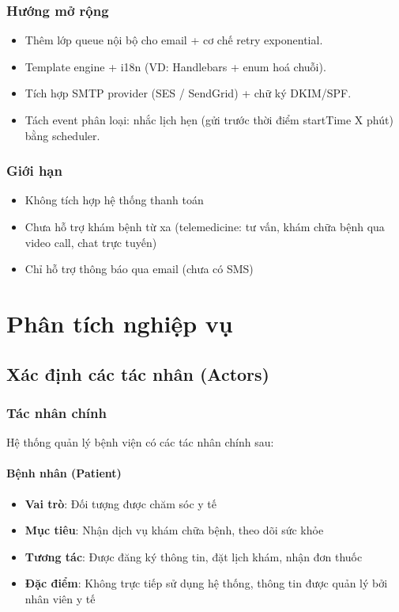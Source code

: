 \documentclass[12pt,a4paper]{report}
\begin{document}
    \subsection*{Hướng mở rộng}
    \begin{itemize}
        \item Thêm lớp queue nội bộ cho email + cơ chế retry exponential.
        \item Template engine + i18n (VD: Handlebars + enum hoá chuỗi).
        \item Tích hợp SMTP provider (SES / SendGrid) + chữ ký DKIM/SPF.
        \item Tách event phân loại: nhắc lịch hẹn (gửi trước thời điểm startTime X phút) bằng scheduler.
    \end{itemize}

    \subsection{Giới hạn}
    \begin{itemize}
        \item Không tích hợp hệ thống thanh toán
        \item Chưa hỗ trợ khám bệnh từ xa (telemedicine: tư vấn, khám chữa bệnh qua video call, chat trực tuyến)
        \item Chỉ hỗ trợ thông báo qua email (chưa có SMS)
    \end{itemize}

    \chapter{Phân tích nghiệp vụ}

    \section{Xác định các tác nhân (Actors)}

    \subsection{Tác nhân chính}
    Hệ thống quản lý bệnh viện có các tác nhân chính sau:

    \subsubsection{Bệnh nhân (Patient)}
    \begin{itemize}
        \item \textbf{Vai trò}: Đối tượng được chăm sóc y tế
        \item \textbf{Mục tiêu}: Nhận dịch vụ khám chữa bệnh, theo dõi sức khỏe
        \item \textbf{Tương tác}: Được đăng ký thông tin, đặt lịch khám, nhận đơn thuốc
        \item \textbf{Đặc điểm}: Không trực tiếp sử dụng hệ thống, thông tin được quản lý bởi nhân viên y tế
    \end{itemize}
\end{document}
